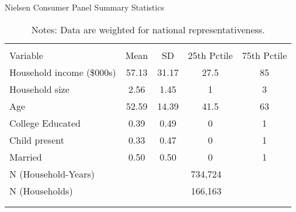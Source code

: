 \begin{table}[!htbp] \centering
\caption{Nielsen Consumer Panel Summary Statistics}
\label{tab:homescanSummaryStats}
\begin{tabular}{lcccc}
\\[-1.8ex]\hline
\hline \\[-1.8ex]
Variable                  & Mean  & SD    & 25th Pctile & 75th Pctile\\
\hline
Household income (\$000s) & 57.13 & 31.17 & 27.5        & 85 \\
Household size            & 2.56  & 1.45  & 1           & 3 \\
Age                       & 52.59 & 14.39 & 41.5        & 63 \\
College Educated          & 0.39  & 0.49  & 0           & 1 \\
Child present             & 0.33  & 0.47  & 0           & 1 \\
Married                   & 0.50  & 0.50  & 0           & 1 \\
\hline
N (Household-Years)       & \multicolumn{4}{c}{734,724} \\
N (Households)            & \multicolumn{4}{c}{166,163} \\
\\[-1.8ex]\hline
\hline \\[-1.8ex]
\end{tabular}
\caption*{Notes: Data are weighted for national representativeness.}
\end{table}

